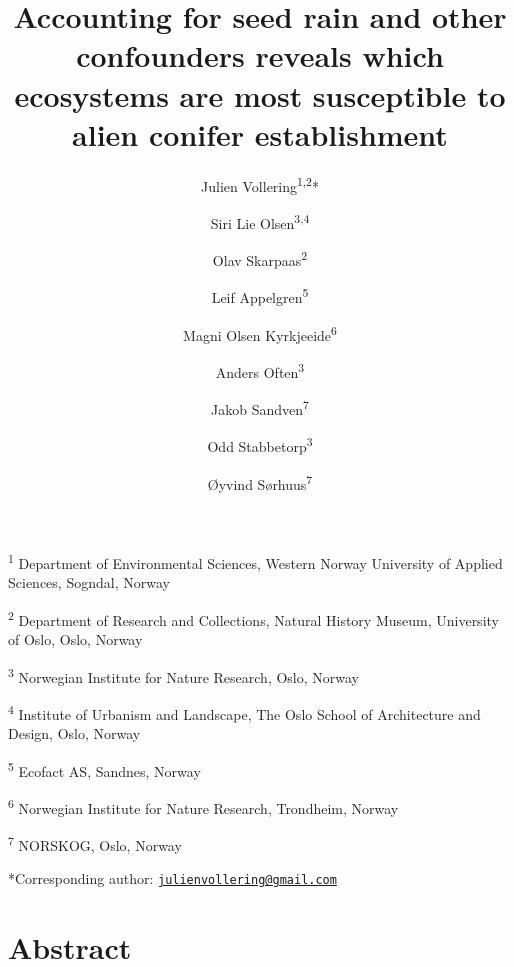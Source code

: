 \documentclass[
]{article}
\title{Accounting for seed rain and other confounders reveals which ecosystems are most susceptible to alien conifer establishment}
\author{Julien Vollering\textsuperscript{1,2}* \and Siri Lie Olsen\textsuperscript{3,4} \and Olav Skarpaas\textsuperscript{2} \and Leif Appelgren\textsuperscript{5} \and Magni Olsen Kyrkjeeide\textsuperscript{6} \and Anders Often\textsuperscript{3} \and Jakob Sandven\textsuperscript{7} \and Odd Stabbetorp\textsuperscript{3} \and Øyvind Sørhuus\textsuperscript{7}}
\date{}
\begin{document}
\maketitle

\textsuperscript{1} Department of Environmental Sciences, Western Norway University of Applied Sciences, Sogndal, Norway

\textsuperscript{2} Department of Research and Collections, Natural History Museum, University of Oslo, Oslo, Norway

\textsuperscript{3} Norwegian Institute for Nature Research, Oslo, Norway

\textsuperscript{4} Institute of Urbanism and Landscape, The Oslo School of Architecture and Design, Oslo, Norway

\textsuperscript{5} Ecofact AS, Sandnes, Norway

\textsuperscript{6} Norwegian Institute for Nature Research, Trondheim, Norway

\textsuperscript{7} NORSKOG, Oslo, Norway

*Corresponding author: \href{mailto:julienvollering@gmail.com}{\nolinkurl{julienvollering@gmail.com}}

\hypertarget{abstract}{%
\section*{Abstract}\label{abstract}}
\end{document}
